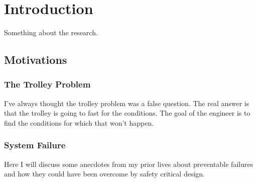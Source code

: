 \chapter{Introduction}
Something about the research. \lipsum[1]
\section{Motivations}
\subsection{The Trolley Problem}
I've always thought the trolley problem was a false question. The real answer is that the trolley is going to fast for the conditions. The goal of the engineer is to find the conditions for which that won't happen.
\lipsum[1-3]
\subsection{System Failure}
Here I will discuss some anecdotes from my prior lives about preventable failures and how they could have been overcome by safety critical design.
\lipsum[1-3]

